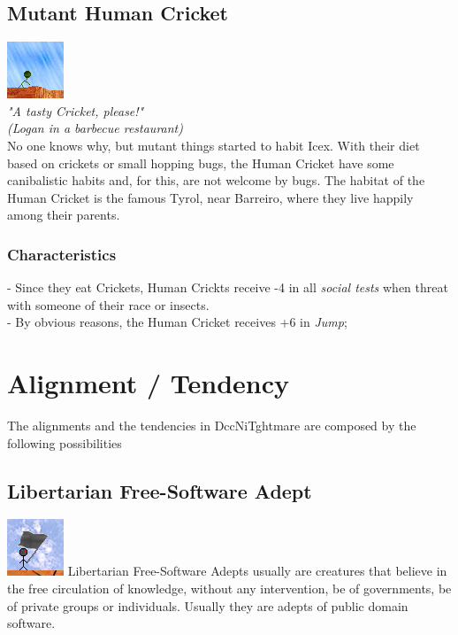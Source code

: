\documentclass[ letterpaper,12pt]{article}
\begin{document}
\subsection{Mutant Human Cricket}
\includegraphics{../data/races/Img/grilo.png}\\
{\it "A tasty Cricket, please!"\\
(Logan in a barbecue restaurant)}\\

No one knows why, but mutant things started to habit Icex. With their diet
based on crickets or small hopping bugs, the Human Cricket have some
canibalistic habits and, for this, are not welcome by bugs. The habitat of the
Human Cricket is the famous Tyrol, near Barreiro, where they live happily
among their parents.

\subsubsection{Characteristics}
- Since they eat Crickets, Human Crickts receive -4 in all {\it social tests} when threat with someone of their race or insects.\\
- By obvious reasons, the Human Cricket receives +6 in {\it Jump};\\


\section{Alignment / Tendency}

The alignments and the tendencies in DccNiTghtmare are composed by the following possibilities\\

\subsection{Libertarian Free-Software Adept}\includegraphics{../data/alignment/Img/libertarian.png} Libertarian Free-Software Adepts usually are creatures that believe in the free circulation of knowledge, without any intervention, be of governments, be of private groups or individuals. Usually they are adepts of public domain software.
\end{document}
